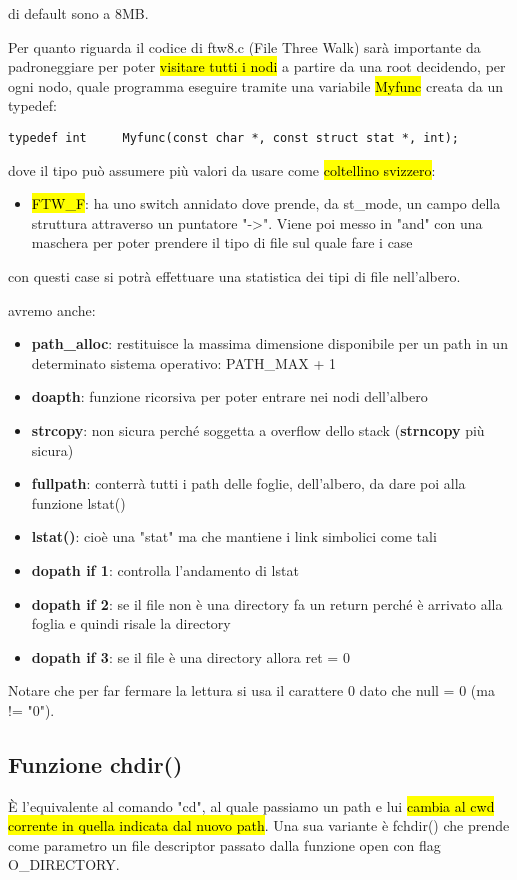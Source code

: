 di default sono a 8MB.

Per quanto riguarda il codice di ftw8.c (File Three Walk) sarà importante da padroneggiare per poter \hl{visitare tutti i nodi} a partire da una root decidendo, per ogni nodo, quale programma eseguire tramite una variabile \hl{Myfunc} creata da un typedef:

\begin{lstlisting}
typedef int     Myfunc(const char *, const struct stat *, int);
\end{lstlisting}

dove il tipo può assumere più valori da usare come \hl{coltellino svizzero}: 

\begin{itemize}
	\item \hl{FTW\_F}: ha uno switch annidato dove prende, da st\_mode, un campo della struttura attraverso un puntatore "->". Viene poi messo in "and" con una maschera per poter prendere il tipo di file sul quale fare i case
\end{itemize}

con questi case si potrà effettuare una statistica dei tipi di file nell'albero.

avremo anche:

\begin{itemize}
	\item \textbf{path\_alloc}: restituisce la massima dimensione disponibile per un path in un determinato sistema operativo: PATH\_MAX + 1
	\item \textbf{doapth}: funzione ricorsiva per poter entrare nei nodi dell'albero
	\item \textbf{strcopy}: non sicura perché soggetta a overflow dello stack (\textbf{strncopy} più sicura)
	\item \textbf{fullpath}: conterrà tutti i path delle foglie, dell'albero, da dare poi alla funzione lstat()
	\item \textbf{lstat()}: cioè una "stat" ma che mantiene i link simbolici come tali
	\item \textbf{dopath if 1}: controlla l'andamento di lstat
	\item \textbf{dopath if 2}: se il file non è una directory fa un return perché è arrivato alla foglia e quindi risale la directory
	\item \textbf{dopath if 3}: se il file è una directory allora ret = 0
\end{itemize}

Notare che per far fermare la lettura si usa il carattere $0$ dato che null = 0 (ma != "0").



\subsection{Funzione chdir()}

È l'equivalente al comando "cd", al quale passiamo un path e lui \hl{cambia al cwd corrente in quella indicata dal nuovo path}. Una sua variante è fchdir() che prende come parametro un file descriptor passato dalla funzione open con flag O\_DIRECTORY.